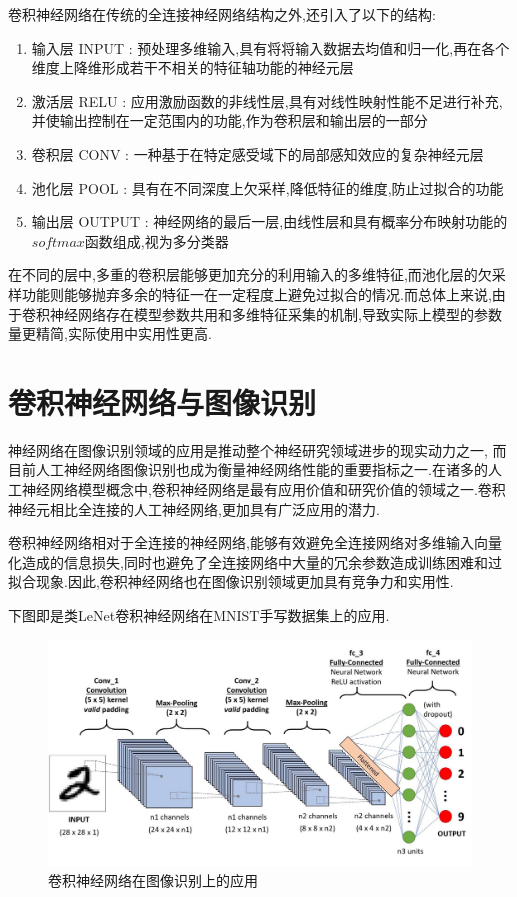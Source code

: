 卷积神经网络在传统的全连接神经网络结构之外,还引入了以下的结构:
\begin{enumerate}
	
	\item 输入层 INPUT : 预处理多维输入,具有将将输入数据去均值和归一化,再在各个维度上降维形成若干不相关的特征轴功能的神经元层
	\item 激活层 RELU : 应用激励函数的非线性层,具有对线性映射性能不足进行补充,并使输出控制在一定范围内的功能,作为卷积层和输出层的一部分
	\item 卷积层 CONV : 一种基于在特定感受域下的局部感知效应的复杂神经元层
	\item 池化层 POOL : 具有在不同深度上欠采样,降低特征的维度,防止过拟合的功能
	\item 输出层 OUTPUT : 神经网络的最后一层,由线性层和具有概率分布映射功能的$softmax$函数组成,视为多分类器
\end{enumerate}

在不同的层中,多重的卷积层能够更加充分的利用输入的多维特征,而池化层的欠采样功能则能够抛弃多余的特征一在一定程度上避免过拟合的情况.而总体上来说,由于卷积神经网络存在模型参数共用和多维特征采集的机制,导致实际上模型的参数量更精简,实际使用中实用性更高.

\section{卷积神经网络与图像识别}

神经网络在图像识别领域的应用是推动整个神经研究领域进步的现实动力之一, 而目前人工神经网络图像识别也成为衡量神经网络性能的重要指标之一.在诸多的人工神经网络模型概念中,卷积神经网络是最有应用价值和研究价值的领域之一.卷积神经元相比全连接的人工神经网络,更加具有广泛应用的潜力.

卷积神经网络相对于全连接的神经网络,能够有效避免全连接网络对多维输入向量化造成的信息损失,同时也避免了全连接网络中大量的冗余参数造成训练困难和过拟合现象.因此,卷积神经网络也在图像识别领域更加具有竞争力和实用性.


下图即是类LeNet卷积神经网络在MNIST手写数据集上的应用.

\begin{figure}
	\centering
	\includegraphics[scale=0.3]{Figures/CNN2.jpg}
	\caption{卷积神经网络在图像识别上的应用}
\end{figure}

